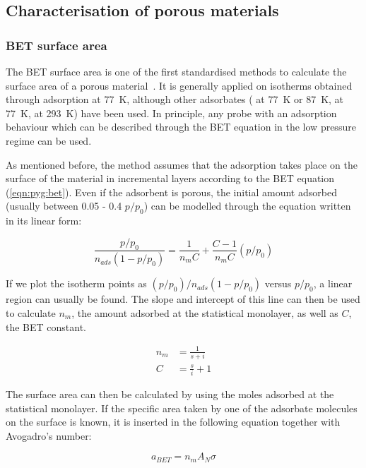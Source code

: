 \subsection{Characterisation of porous materials}

\subsubsection{BET surface area}

The BET surface area is one of the first standardised methods 
to calculate the surface area of a porous 
material~\cite{brunauerAdsorptionGasesMultimolecular1938}. 
It is generally applied on isotherms obtained through  
adsorption at \SI{77}{\kelvin}, although other adsorbates 
( at \SI{77}{\kelvin} or \SI{87}{\kelvin}, 
 at \SI{77}{\kelvin},  at \SI{293}{\kelvin})
have been used. In principle, any probe with an adsorption behaviour 
which can be described through the BET equation in the low pressure regime
can be used.

As mentioned before, the method assumes that the adsorption takes place 
on the surface of the material in incremental layers according to the
BET equation (\ref{eqn:pyg:bet}). 
Even if the adsorbent is porous, the initial amount adsorbed 
(usually between 0.05 - 0.4 \(p/p_0\)) can be
modelled through the equation written in its linear form:

\begin{equation}
    \frac{p/p_0}{n_{ads} (1-p/p_0)} = \frac{1}{n_{m} C} + \frac{C - 1}{n_{m} C}(p/p_0)
\end{equation}

If we plot the isotherm points as
\({(p/p_0)}/{n_{ads}(1-p/p_0)}\) versus \(p/p_0\), a linear region
can usually be found. The slope and intercept of this line
can then be used to calculate \(n_{m}\), the amount adsorbed at the
statistical monolayer, as well as \(C\), the BET constant.

\begin{align}
    n_{m} &= \frac{1}{s+i} \\
    C &= \frac{s}{i} + 1
\end{align}

The surface area can then be calculated by using the moles
adsorbed at the statistical monolayer. If the specific area taken
by one of the adsorbate molecules on the surface is known, it is
inserted in the following equation together with Avogadro's number:

\begin{equation}
    a_{BET} = n_m A_N \sigma
\end{equation}

